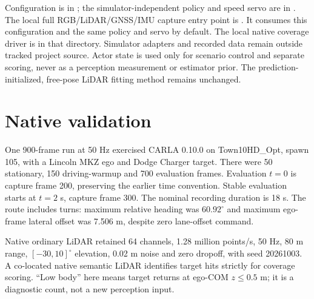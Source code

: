 \documentclass[11pt]{article}
\begin{document}
Configuration is in ; the simulator-independent
policy and speed servo are in .
The local full RGB/LiDAR/GNSS/IMU capture entry point is
.
It consumes this configuration and the same policy and servo by default.
The local native coverage driver is  in that directory.
Simulator adapters and recorded data remain outside tracked project source.
Actor state is used only for scenario control and separate scoring, never
as a perception measurement or estimator prior. The prediction-initialized,
free-pose LiDAR fitting method remains unchanged.

\section{Native validation}
One 900-frame run at 50 Hz exercised CARLA 0.10.0 on Town10HD\_Opt, spawn 105,
with a Lincoln MKZ ego and Dodge Charger target. There were 50 stationary,
150 driving-warmup and 700 evaluation frames. Evaluation $t=0$ is capture
frame 200, preserving the earlier time convention. Stable evaluation starts
at $t=2$ s, capture frame 300. The nominal recording duration is 18 s.
The route includes turns: maximum relative heading was $60.92^\circ$ and
maximum ego-frame lateral offset was 7.506 m, despite zero lane-offset command.

Native ordinary LiDAR retained 64 channels, 1.28 million points/s, 50 Hz,
80 m range, $[-30,10]^\circ$ elevation, 0.02 m noise and zero dropoff, with seed
20261003. A co-located native semantic LiDAR identifies target hits strictly
for coverage scoring. ``Low body'' here means target returns at ego-COM
$z\leq0.5$ m; it is a diagnostic count, not a new perception input.
\end{document}
